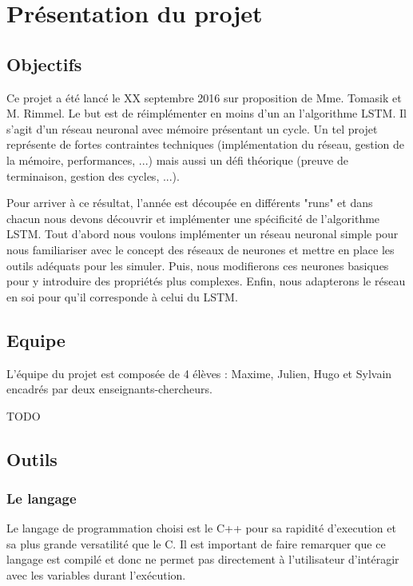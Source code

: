 \chapter{Présentation du projet}

\section{Objectifs}

Ce projet a été lancé le XX septembre 2016 sur proposition de Mme. Tomasik et M. Rimmel. Le but est de réimplémenter en moins d'un an l'algorithme LSTM\footnotemark. Il s'agit d'un réseau neuronal avec mémoire présentant un cycle.
Un tel projet représente de fortes contraintes techniques (implémentation du réseau, gestion de la mémoire, performances, ...) mais aussi un défi théorique (preuve de terminaison, gestion des cycles, ...).

\bigskip

Pour arriver à ce résultat, l'année est découpée en différents "runs" et dans chacun nous devons découvrir et implémenter une spécificité de l'algorithme LSTM. Tout d'abord nous voulons implémenter un réseau neuronal simple pour nous familiariser avec le concept des réseaux de neurones et mettre en place les outils adéquats pour les simuler. Puis, nous modifierons ces neurones basiques pour y introduire des propriétés plus complexes. Enfin, nous adapterons le réseau en soi pour qu'il corresponde à celui du LSTM.

\section{Equipe}

L'équipe du projet est composée de 4 élèves : Maxime, Julien, Hugo et Sylvain encadrés par deux enseignants-chercheurs.

TODO

\section{Outils}

\subsection{Le langage}
Le langage de programmation choisi est le C++ pour sa rapidité d'execution et sa plus grande versatilité que le C. Il est important de faire remarquer que ce langage est compilé et donc ne permet pas directement à l'utilisateur d'intéragir avec les variables durant l'exécution.
